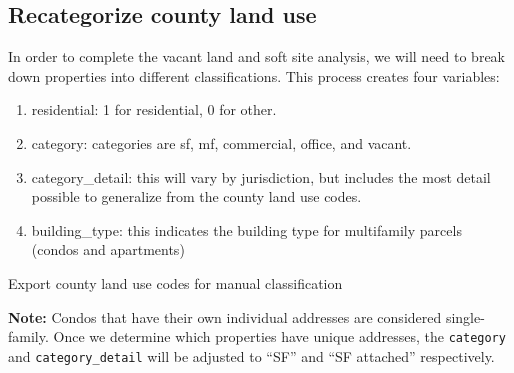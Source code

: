 \documentclass[]{article}
\newenvironment{Shaded}{\begin{snugshade}}{\end{snugshade}}
\newcommand{\KeywordTok}[1]{\textcolor[rgb]{0.13,0.29,0.53}{\textbf{#1}}}
\newcommand{\StringTok}[1]{\textcolor[rgb]{0.31,0.60,0.02}{#1}}
\newcommand{\ControlFlowTok}[1]{\textcolor[rgb]{0.13,0.29,0.53}{\textbf{#1}}}
\newcommand{\OperatorTok}[1]{\textcolor[rgb]{0.81,0.36,0.00}{\textbf{#1}}}
\newcommand{\NormalTok}[1]{#1}
\providecommand{\tightlist}{%
  \setlength{\itemsep}{0pt}\setlength{\parskip}{0pt}}
\begin{document}
\subsection{Recategorize county land
use}\label{recategorize-county-land-use}

In order to complete the vacant land and soft site analysis, we will
need to break down properties into different classifications. This
process creates four variables:

\begin{enumerate}
\def\labelenumi{\arabic{enumi}.}
\tightlist
\item
  residential: 1 for residential, 0 for other.
\item
  category: categories are sf, mf, commercial, office, and vacant.
\item
  category\_detail: this will vary by jurisdiction, but includes the
  most detail possible to generalize from the county land use codes.
\item
  building\_type: this indicates the building type for multifamily
  parcels (condos and apartments)
\end{enumerate}

Export county land use codes for manual classification

\begin{Shaded}
\end{Shaded}

\textbf{Note:} Condos that have their own individual addresses are
considered single-family. Once we determine which properties have unique
addresses, the \texttt{category} and \texttt{category\_detail} will be
adjusted to ``SF'' and ``SF attached'' respectively.
\end{document}
